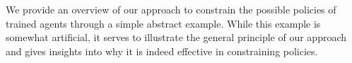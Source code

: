 \begin{proofoutline}\label{proof:jpc_to_ac}

    We provide an overview of our approach to constrain the possible policies of trained agents through a simple abstract example. While this example is somewhat artificial, it serves to illustrate the general principle of our approach and gives insights into why it is indeed effective in constraining policies.



\end{proofoutline}
